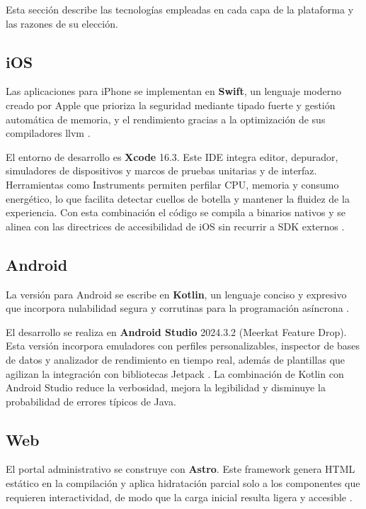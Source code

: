 \begin{large}

Esta sección describe las tecnologías empleadas en cada capa de la plataforma y las razones de su elección.

\subsection*{iOS}

Las aplicaciones para iPhone se implementan en \textbf{Swift}, un lenguaje moderno creado por Apple que prioriza la seguridad mediante tipado fuerte y gestión automática de memoria, y el rendimiento gracias a la optimización de sus compiladores \gls{llvm} \cite{swift_lang2025}.

El entorno de desarrollo es \textbf{Xcode} 16.3. Este IDE integra editor, depurador, simuladores de dispositivos y marcos de pruebas unitarias y de interfaz. Herramientas como Instruments permiten perfilar CPU, memoria y consumo energético, lo que facilita detectar cuellos de botella y mantener la fluidez de la experiencia. Con esta combinación el código se compila a binarios nativos y se alinea con las directrices de accesibilidad de iOS sin recurrir a SDK externos \cite{xcode16_3}.

\subsection*{Android}

La versión para Android se escribe en \textbf{Kotlin}, un lenguaje conciso y expresivo que incorpora nulabilidad segura y corrutinas para la programación asíncrona \cite{kotlin_lang2025}.

El desarrollo se realiza en \textbf{Android Studio} 2024.3.2 (Meerkat Feature Drop). Esta versión incorpora emuladores con perfiles personalizables, inspector de bases de datos y analizador de rendimiento en tiempo real, además de plantillas que agilizan la integración con bibliotecas Jetpack \cite{as2024_3_2}. La combinación de Kotlin con Android Studio reduce la verbosidad, mejora la legibilidad y disminuye la probabilidad de errores típicos de Java.

\subsection*{Web}

El portal administrativo se construye con \textbf{Astro}. Este framework genera HTML estático en la compilación y aplica hidratación parcial solo a los componentes que requieren interactividad, de modo que la carga inicial resulta ligera y accesible \cite{astro_docs2025}.


\end{large}

